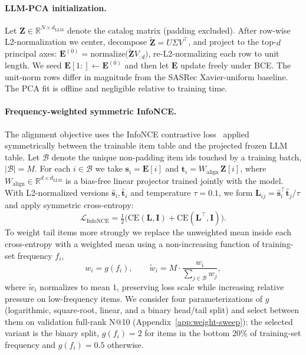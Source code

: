 \documentclass{article}
\begin{document}
\paragraph{LLM-PCA initialization.}
\label{sec:llm-pca}
Let $\mathbf{Z} \in \mathbb{R}^{N \times d_\text{LLM}}$ denote the
catalog matrix (padding excluded). After row-wise L2-normalization we
center, decompose
$\tilde{\mathbf{Z}} = U \Sigma V^\top$, and project to the top-$d$
principal axes:
$\mathbf{E}^{(0)} = \mathrm{normalize}\big(\tilde{\mathbf{Z}} V_{:d}\big)$,
re-L2-normalizing each row to unit length. We seed
$\mathbf{E}[1{:}] \gets \mathbf{E}^{(0)}$ and then let $\mathbf{E}$
update freely under BCE. The unit-norm rows differ in magnitude from
the SASRec Xavier-uniform baseline. The PCA fit is offline
and negligible relative to training time.

\paragraph{Frequency-weighted symmetric InfoNCE.}
\label{sec:freq-infonce}
The alignment objective uses the InfoNCE contrastive
loss~\cite{vandenoord2018cpc} applied symmetrically between the
trainable item table and the projected frozen LLM table. Let
$\mathcal{B}$ denote the unique non-padding item ids touched by a
training batch, $|\mathcal{B}| = M$. For each $i \in \mathcal{B}$ we
take $\mathbf{s}_i = \mathbf{E}[i]$ and
$\mathbf{t}_i = W_\text{align}\, \mathbf{Z}[i]$, where
$W_\text{align} \in \mathbb{R}^{d \times d_\text{LLM}}$ is a bias-free
linear projector trained jointly with the model. With L2-normalized
versions $\hat{\mathbf{s}}_i, \hat{\mathbf{t}}_i$ and temperature
$\tau = 0.1$, we form
$\mathbf{L}_{ij} = \hat{\mathbf{s}}_i^\top \hat{\mathbf{t}}_j / \tau$
and apply symmetric cross-entropy:
\begin{equation}
  \mathcal{L}_\text{InfoNCE} = \tfrac{1}{2}\bigl(\mathrm{CE}(\mathbf{L}, \mathbf{I}) + \mathrm{CE}(\mathbf{L}^\top, \mathbf{I})\bigr).
  \label{eq:infonce}
\end{equation}
To weight tail items more strongly we replace the unweighted mean
inside each cross-entropy with a weighted mean using a
non-increasing function of training-set frequency $f_i$,
\begin{equation}
  w_i = g(f_i), \qquad \tilde{w}_i = M \cdot \frac{w_i}{\sum_{j \in \mathcal{B}} w_j},
  \label{eq:freq-weights}
\end{equation}
where $\tilde{w}_i$ normalizes to mean $1$, preserving loss scale
while increasing relative pressure on low-frequency items. We
consider four parameterizations of $g$ (logarithmic, square-root,
linear, and a binary head/tail split) and select between them on
validation full-rank N@10 (Appendix~\ref{app:weight-sweep});
the selected variant is the binary split, $g(f_i) = 2$ for items
in the bottom 20\% of training-set frequency and $g(f_i) = 0.5$
otherwise.
\end{document}
